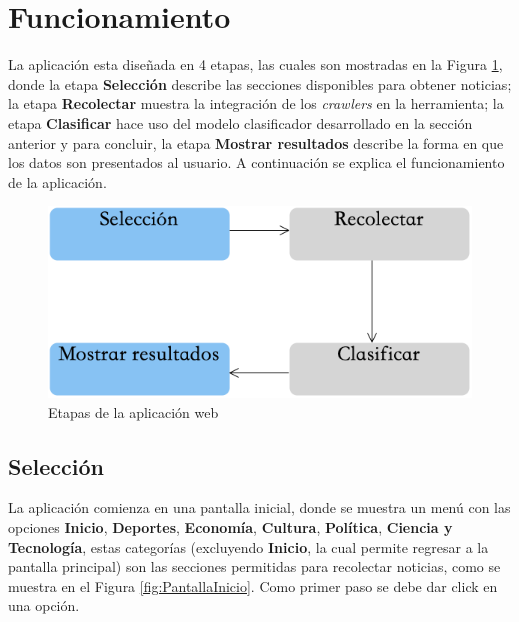 \section{Funcionamiento}

La aplicación esta diseñada en 4 etapas, las cuales son mostradas en la Figura \ref{fig:procesoAppWeb}, donde la etapa \textbf{Selección} describe las secciones disponibles para obtener noticias; la etapa \textbf{Recolectar} muestra la integración de los \textit{crawlers} en la herramienta; la etapa \textbf{Clasificar} hace uso del modelo clasificador desarrollado en la sección anterior y para concluir, la etapa \textbf{Mostrar resultados} describe la forma en que los datos son presentados al usuario. A continuación se explica el funcionamiento de la aplicación.


\begin{figure}[H]
	\centering
	\includegraphics[scale=0.5]{imagenes/ProcesoAplicacionWeb.png}
	\caption{Etapas de la aplicación web}
	\label{fig:procesoAppWeb}
\end{figure}


\subsection{Selección}


La aplicación comienza en una pantalla inicial, donde se muestra un menú con las opciones \textbf{Inicio}, \textbf{Deportes}, \textbf{Economía}, \textbf{Cultura}, \textbf{Política}, \textbf{Ciencia y Tecnología}, estas categorías (excluyendo \textbf{Inicio}, la cual permite regresar a la pantalla principal) son las secciones permitidas para recolectar noticias, como se muestra en el Figura \ref{fig:PantallaInicio}. Como primer paso se debe dar click en una opción.\\


